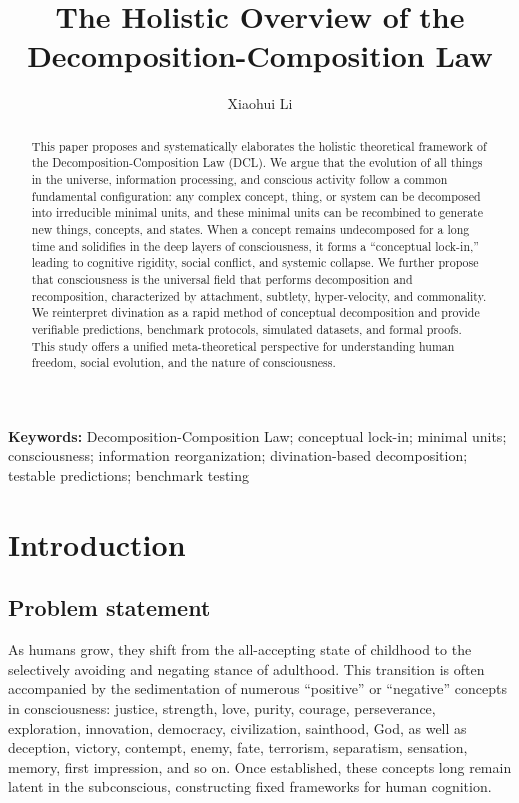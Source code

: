 \documentclass[11pt,a4paper]{article}
\title{\textbf{The Holistic Overview of the Decomposition-Composition Law}}
\author[1]{Xiaohui Li}
\affil[1]{Independent Researcher, Baoji, China}
\affil[ ]{Corresponding author: Xiaohui Li (email: danceluck@163.com)}
\affil[ ]{ORCID: 0009-0003-8233-7191}
\affil[ ]{Data homepage: \url{https://github.com/xiaohui-li-lab/}}
\date{}
\begin{document}
\maketitle

\begin{abstract}
\noindent
This paper proposes and systematically elaborates the holistic theoretical framework of the Decomposition-Composition Law (DCL). We argue that the evolution of all things in the universe, information processing, and conscious activity follow a common fundamental configuration: any complex concept, thing, or system can be decomposed into irreducible minimal units, and these minimal units can be recombined to generate new things, concepts, and states. When a concept remains undecomposed for a long time and solidifies in the deep layers of consciousness, it forms a ``conceptual lock-in,'' leading to cognitive rigidity, social conflict, and systemic collapse. We further propose that consciousness is the universal field that performs decomposition and recomposition, characterized by attachment, subtlety, hyper-velocity, and commonality. We reinterpret divination as a rapid method of conceptual decomposition and provide verifiable predictions, benchmark protocols, simulated datasets, and formal proofs. This study offers a unified meta-theoretical perspective for understanding human freedom, social evolution, and the nature of consciousness.
\end{abstract}

\noindent\textbf{Keywords:} Decomposition-Composition Law; conceptual lock-in; minimal units; consciousness; information reorganization; divination-based decomposition; testable predictions; benchmark testing

\section{Introduction}

\subsection{Problem statement}

As humans grow, they shift from the all-accepting state of childhood to the selectively avoiding and negating stance of adulthood. This transition is often accompanied by the sedimentation of numerous ``positive'' or ``negative'' concepts in consciousness: justice, strength, love, purity, courage, perseverance, exploration, innovation, democracy, civilization, sainthood, God, as well as deception, victory, contempt, enemy, fate, terrorism, separatism, sensation, memory, first impression, and so on. Once established, these concepts long remain latent in the subconscious, constructing fixed frameworks for human cognition.
\end{document}
